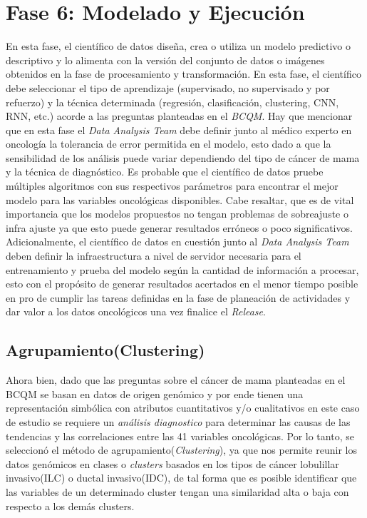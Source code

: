 \clearpage
\section{Fase 6: Modelado y Ejecución}
En esta fase, el científico de datos diseña, crea o utiliza un modelo predictivo o descriptivo y lo alimenta con la versión del conjunto de datos o imágenes obtenidos en la fase de procesamiento y transformación. En esta fase, el científico debe seleccionar el tipo de aprendizaje (supervisado, no supervisado y por refuerzo) y la técnica determinada (regresión, clasificación, clustering, CNN, RNN, etc.) acorde a las preguntas planteadas en el \textit{BCQM}. Hay que mencionar que en esta fase el \textit{Data Analysis Team} debe definir junto al médico experto en oncología la tolerancia de error permitida en el modelo, esto dado a que la sensibilidad de los análisis puede variar dependiendo del tipo de cáncer de mama y la técnica de diagnóstico. Es probable que el científico de datos pruebe múltiples algoritmos con sus respectivos parámetros para encontrar el mejor modelo para las variables oncológicas disponibles. Cabe resaltar, que es de vital importancia que los modelos propuestos no tengan problemas de sobreajuste o infra ajuste ya que esto puede generar resultados erróneos o poco significativos. Adicionalmente, el científico de datos en cuestión junto al \textit{Data Analysis Team} deben definir la infraestructura a nivel de servidor necesaria para el entrenamiento y prueba del modelo según la cantidad de información a procesar, esto con el propósito de generar resultados acertados en el menor tiempo posible en pro de cumplir las tareas definidas en la fase de planeación de actividades y dar valor a los datos oncológicos una vez finalice el \textit{Release}.

\subsection{Agrupamiento(Clustering)}
Ahora bien, dado que las preguntas sobre el cáncer de mama planteadas en el BCQM se basan en datos de origen genómico y por ende tienen una representación simbólica con atributos cuantitativos y/o cualitativos en este caso de estudio se requiere un \textit{análisis diagnostico} para determinar las causas de las tendencias y las correlaciones entre las 41 variables oncológicas. Por lo tanto, se seleccionó el método de agrupamiento(\textit{Clustering}), ya que nos permite reunir los datos genómicos en clases o \textit{clusters} basados en los tipos de cáncer lobulillar invasivo(ILC) o ductal invasivo(IDC), de tal forma que es posible identificar que las variables de un determinado cluster tengan una similaridad alta o baja con respecto a los demás clusters.

